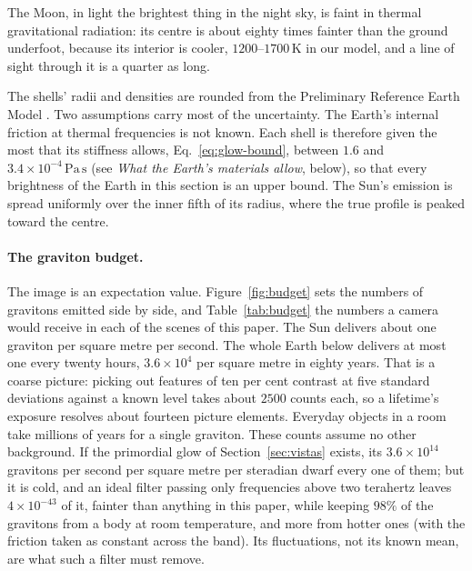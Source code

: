 The Moon, in light the brightest thing in the night sky, is faint in thermal
gravitational radiation: its centre is about eighty
times fainter than the ground underfoot, because its interior is cooler,
$1200$--$1700\,\mathrm{K}$ in our model, and a line of sight through it is a
quarter as long.

The shells' radii and densities are rounded from the Preliminary Reference
Earth Model \cite{DziewonskiAnderson1981}. Two assumptions carry most of the
uncertainty. The Earth's internal friction
at thermal frequencies is not known. Each shell is therefore given the
most that its stiffness allows, Eq.~\eqref{eq:glow-bound}, between $1.6$ and
$3.4\times10^{-4}\,\mathrm{Pa\,s}$ (see \emph{What the Earth's materials
allow}, below), so that every brightness of the Earth in this section is an
upper bound. The Sun's
emission is spread uniformly over the inner fifth of its radius, where the
true profile is peaked toward the centre.

\paragraph{The graviton budget.} The image is an expectation value. Figure~\ref{fig:budget}
sets the numbers of gravitons emitted side by side, and Table~\ref{tab:budget}
the numbers a camera would receive in each of the scenes of this paper.
The Sun delivers about one graviton per square metre per second. The whole
Earth below delivers at most one every twenty hours,
$3.6\times10^{4}$ per square metre in eighty years. That is a coarse picture: picking out features of
ten per cent contrast at five standard deviations against a known level takes
about $2500$ counts each, so a lifetime's exposure resolves about fourteen picture
elements. Everyday objects in a room take millions of years
for a single graviton. These counts assume no other background. If the
primordial glow of Section~\ref{sec:vistas} exists, its
$3.6\times10^{14}$ gravitons per second per square metre per steradian dwarf
every one of them; but it is cold, and an ideal filter passing only frequencies
above two terahertz leaves $4\times10^{-43}$ of it, fainter than anything in
this paper, while keeping $98\%$ of the gravitons from a body at room
temperature, and more from hotter ones (with the
friction taken as constant across the band). Its fluctuations, not its known
mean, are what such a filter must remove.

